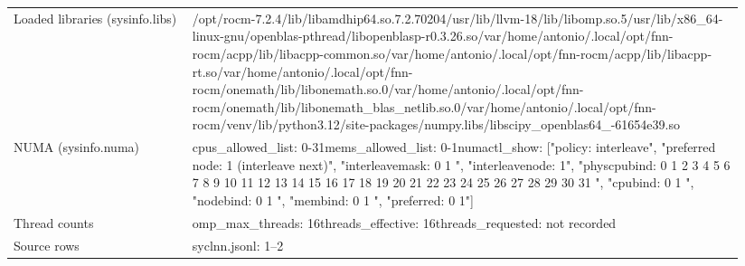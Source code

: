 \begin{longtable}{>{\raggedright\arraybackslash}p{0.23\linewidth}>{\raggedright\arraybackslash}p{0.71\linewidth}}
Loaded libraries (sysinfo.libs) & /\allowbreak{}opt/\allowbreak{}rocm-7.2.4/\allowbreak{}lib/\allowbreak{}libamdhip64.so.7.2.70204\newline /\allowbreak{}usr/\allowbreak{}lib/\allowbreak{}llvm-18/\allowbreak{}lib/\allowbreak{}libomp.so.5\newline /\allowbreak{}usr/\allowbreak{}lib/\allowbreak{}x86\_\allowbreak{}64-linux-gnu/\allowbreak{}openblas-pthread/\allowbreak{}libopenblasp-r0.3.26.so\newline /\allowbreak{}var/\allowbreak{}home/\allowbreak{}antonio/\allowbreak{}.local/\allowbreak{}opt/\allowbreak{}fnn-rocm/\allowbreak{}acpp/\allowbreak{}lib/\allowbreak{}libacpp-common.so\newline /\allowbreak{}var/\allowbreak{}home/\allowbreak{}antonio/\allowbreak{}.local/\allowbreak{}opt/\allowbreak{}fnn-rocm/\allowbreak{}acpp/\allowbreak{}lib/\allowbreak{}libacpp-rt.so\newline /\allowbreak{}var/\allowbreak{}home/\allowbreak{}antonio/\allowbreak{}.local/\allowbreak{}opt/\allowbreak{}fnn-rocm/\allowbreak{}onemath/\allowbreak{}lib/\allowbreak{}libonemath.so.0\newline /\allowbreak{}var/\allowbreak{}home/\allowbreak{}antonio/\allowbreak{}.local/\allowbreak{}opt/\allowbreak{}fnn-rocm/\allowbreak{}onemath/\allowbreak{}lib/\allowbreak{}libonemath\_\allowbreak{}blas\_\allowbreak{}netlib.so.0\newline /\allowbreak{}var/\allowbreak{}home/\allowbreak{}antonio/\allowbreak{}.local/\allowbreak{}opt/\allowbreak{}fnn-rocm/\allowbreak{}venv/\allowbreak{}lib/\allowbreak{}python3.12/\allowbreak{}site-packages/\allowbreak{}numpy.libs/\allowbreak{}libscipy\_\allowbreak{}openblas64\_\allowbreak{}-61654e39.so \\
NUMA (sysinfo.numa) & cpus\_\allowbreak{}allowed\_\allowbreak{}list: 0-31\newline mems\_\allowbreak{}allowed\_\allowbreak{}list: 0-1\newline numactl\_\allowbreak{}show: ["policy: interleave", "preferred node: 1 (interleave next)", "interleavemask: 0 1 ", "interleavenode: 1", "physcpubind: 0 1 2 3 4 5 6 7 8 9 10 11 12 13 14 15 16 17 18 19 20 21 22 23 24 25 26 27 28 29 30 31 ", "cpubind: 0 1 ", "nodebind: 0 1 ", "membind: 0 1 ", "preferred: 0 1"] \\
Thread counts & omp\_\allowbreak{}max\_\allowbreak{}threads: 16\newline threads\_\allowbreak{}effective: 16\newline threads\_\allowbreak{}requested: not recorded \\
Source rows & syclnn.jsonl: 1–2 \\
\end{longtable}
